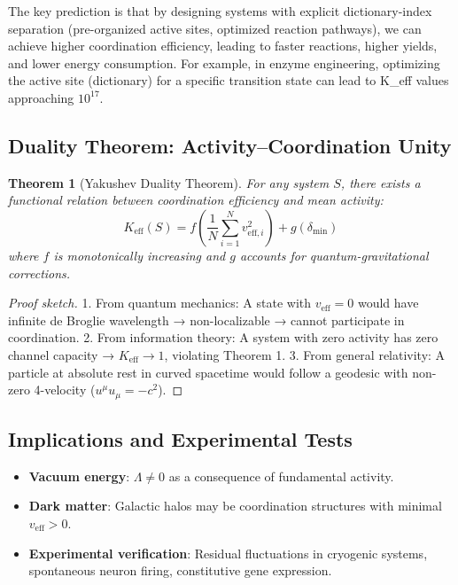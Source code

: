 \documentclass[11pt,a4paper]{article}
\newtheorem{theorem}{Theorem}
\begin{document}
The key prediction is that by designing systems with explicit dictionary-index separation (pre-organized active sites, optimized reaction pathways), we can achieve higher coordination efficiency, leading to faster reactions, higher yields, and lower energy consumption. For example, in enzyme engineering, optimizing the active site (dictionary) for a specific transition state can lead to K\_eff values approaching $10^{17}$.

\subsection{Duality Theorem: Activity–Coordination Unity}

\begin{theorem}[Yakushev Duality Theorem]
	For any system $S$, there exists a functional relation between coordination efficiency and mean activity:
	\[
	K_{\mathrm{eff}}(S) = f\left( \frac{1}{N}\sum_{i=1}^N v_{\mathrm{eff},i}^2 \right) + g(\delta_{\min})
	\]
	where $f$ is monotonically increasing and $g$ accounts for quantum-gravitational corrections.
\end{theorem}

\begin{proof}[Proof sketch]
	1. From quantum mechanics: A state with $v_{\mathrm{eff}} = 0$ would have infinite de Broglie wavelength → non-localizable → cannot participate in coordination.
	2. From information theory: A system with zero activity has zero channel capacity → $K_{\mathrm{eff}} \to 1$, violating Theorem 1.
	3. From general relativity: A particle at absolute rest in curved spacetime would follow a geodesic with non-zero 4-velocity ($u^\mu u_\mu = -c^2$).
\end{proof}

\subsection{Implications and Experimental Tests}

\begin{itemize}
	\item \textbf{Vacuum energy}: $\Lambda \neq 0$ as a consequence of fundamental activity.
	\item \textbf{Dark matter}: Galactic halos may be coordination structures with minimal $v_{\mathrm{eff}} > 0$.
	\item \textbf{Experimental verification}: Residual fluctuations in cryogenic systems, spontaneous neuron firing, constitutive gene expression.
\end{itemize}
\end{document}
